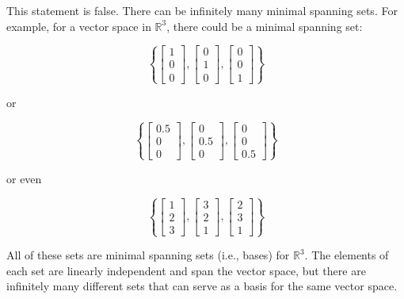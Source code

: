 \documentclass{article}
\begin{document}
This statement is false. There can be infinitely many minimal spanning sets. For example, for a vector space in $\mathbb{R}^3$, there could be a minimal spanning set:

\[
\left\{ 
\begin{bmatrix} 1 \\ 0 \\ 0 \end{bmatrix}, 
\begin{bmatrix} 0 \\ 1 \\ 0 \end{bmatrix}, 
\begin{bmatrix} 0 \\ 0 \\ 1 \end{bmatrix} 
\right\}
\]

or

\[
\left\{ 
\begin{bmatrix} 0.5 \\ 0 \\ 0 \end{bmatrix}, 
\begin{bmatrix} 0 \\ 0.5 \\ 0 \end{bmatrix}, 
\begin{bmatrix} 0 \\ 0 \\ 0.5 \end{bmatrix} 
\right\}
\]

or even

\[
\left\{ 
\begin{bmatrix} 1 \\ 2 \\ 3 \end{bmatrix}, 
\begin{bmatrix} 3 \\ 2 \\ 1 \end{bmatrix}, 
\begin{bmatrix} 2 \\ 3 \\ 1 \end{bmatrix} 
\right\}
\]

All of these sets are minimal spanning sets (i.e., bases) for $\mathbb{R}^3$. The elements of each set are linearly independent and span the vector space, but there are infinitely many different sets that can serve as a basis for the same vector space.
\end{document}
